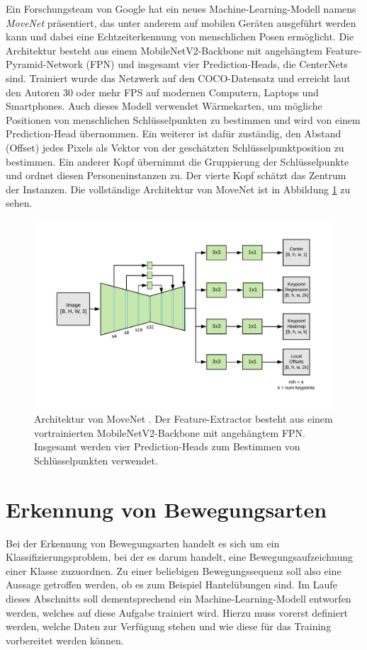 Ein Forschungsteam von Google hat ein neues Machine-Learning-Modell namens
\textit{MoveNet} \cite{movenet} präsentiert, das unter anderem auf mobilen
Geräten ausgeführt werden kann und dabei eine Echtzeiterkennung von menschlichen
Posen ermöglicht. Die Architektur besteht aus einem MobileNetV2-Backbone mit
angehängtem Feature-Pyramid-Network (FPN) und insgesamt vier Prediction-Heads,
die CenterNets \cite{zhou2019objects} sind. Trainiert wurde das Netzwerk
auf den COCO-Datensatz und erreicht laut den Autoren 30 oder mehr FPS auf
modernen Computern, Laptops und Smartphones. Auch dieses Modell verwendet
Wärmekarten, um mögliche Positionen von menschlichen Schlüsselpunkten zu
bestimmen und wird von einem Prediction-Head übernommen. Ein weiterer ist dafür
zuständig, den Abstand (Offset) jedes Pixels als Vektor von der geschätzten
Schlüsselpunktposition zu bestimmen. Ein anderer Kopf übernimmt die Gruppierung
der Schlüsselpunkte und ordnet diesen Personeninstanzen zu. Der vierte Kopf
schätzt das Zentrum der Instanzen. Die vollständige Architektur von MoveNet ist
in Abbildung \ref{fig:movenet-architecture} zu sehen.

\begin{figure}
    \includegraphics[width=\textwidth]{images/movenet_architecture.png}
    \caption{Architektur von MoveNet \cite{movenet}. Der Feature-Extractor
    besteht aus einem vortrainierten MobileNetV2-Backbone mit angehängtem FPN.
    Insgesamt werden vier Prediction-Heads zum Bestimmen von Schlüsselpunkten
    verwendet.}
    \label{fig:movenet-architecture}
\end{figure}

\section{Erkennung von Bewegungsarten}
Bei der Erkennung von Bewegungsarten handelt es sich um ein Klassifizierungsproblem, bei der es darum handelt, eine Bewegungsaufzeichnung einer Klasse zuzuordnen. Zu einer beliebigen Bewegungssequenz soll also eine Aussage getroffen werden, ob es zum Beispiel Hantelübungen sind. Im Laufe dieses Abschnitts soll dementsprechend ein Machine-Learning-Modell entworfen werden, welches auf diese Aufgabe trainiert wird. Hierzu muss vorerst definiert werden, welche Daten zur Verfügung stehen und wie diese für das Training vorbereitet werden können.

